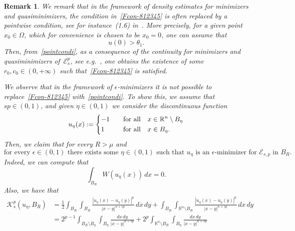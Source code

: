 \documentclass[12pt]{article}
\newcommand{\R}{\mathbb{R}}
\numberwithin{equation}{section}
\newtheorem{rem}[thm]{Remark}
\begin{document}
\begin{rem}
We remark that in the framework of density estimates for minimizers and quasiminimizers, the condition in~\eqref{Fcon-812345} is often replaced by a pointwise condition, see for instance~(1.6) in~\cite{MR3133422}. More precisely, for a given point $x_0\in \Omega$, which for convenience is chosen to be $x_0=0$, one can assume that   
\begin{equation}\label{pointcondi}
u(0)>\theta_1. 
\end{equation}
Then, from~\eqref{pointcondi}, as a consequence of the continuity for minimizers and quasiminimizers of~$\mathcal{E}_s^p$, see e.g.~\cite{MR0666107,giaquinta1984quasi},  one obtains the existence of some $r_0,c_0\in (0,+\infty)$ such that~\eqref{Fcon-812345} is satisfied. 

\medskip
We observe that in the framework of $\epsilon$-minimizers it is not possible to replace~\eqref{Fcon-812345} with~\eqref{pointcondi}. To show this, we assume that $sp\in (0,1)$, and given $\eta\in (0,1)$ we consider the discontinuous function 
\begin{equation*}
u_\eta(x):=\begin{dcases}
-1\quad &\mbox{for all}\quad x\in \R^n\setminus  B_{\eta}\\
1\quad &\mbox{for all}\quad x\in B_{\eta}.
\end{dcases}
\end{equation*} 
Then, we claim that for every $R>\mu$ and
\begin{equation}\label{klmaim}
\mbox{for every $\epsilon\in (0,1)$ there exists some $\eta\in (0,1)$ such that $u_\eta$ is an $\epsilon$-minimizer for $\mathcal{E}_{s,p}$ in $B_R$.}
\end{equation}
Indeed, we can compute that 
\begin{equation}\label{pl1234}
\int_{B_R}W\left(u_\eta(x)\right)\,dx=0.
\end{equation}
Also, we have that 
\begin{equation}\label{pm5678}
\begin{split}
\mathcal{K}_s^p\left(u_\eta,B_R\right)&=\frac{1}{2}\int_{B_R}\int_{B_R}\frac{\left|u_\eta(x)-u_\eta(y)\right|^p}{\left|x-y\right|^{n+sp}}\,dx\,dy+\int_{B_R}\int_{\R^n\setminus B_R}\frac{\left|u_\eta(x)-u_\eta(y)\right|^p}{\left|x-y\right|^{n+sp}}\,dx\,dy\\
&=2^{p-1}\int_{B_R\setminus B_\eta}\int_{B_\eta}\frac{dx\,dy}{\left|x-y\right|^{n+sp}}+2^p\int_{\R^n\setminus B_R}\int_{B_\eta}\frac{dx\,dy}{\left|x-y\right|^{n+sp}}\\

\end{split}
\end{equation}
\end{rem}
\end{document}
